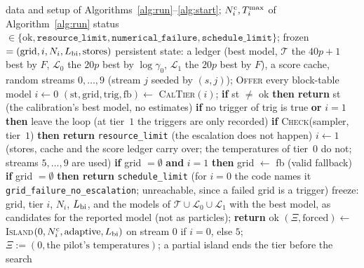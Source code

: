 \begin{algorithm}
\caption{Stage~4: calibration (adaptive tempering): pilot, grid, rebuilds, tier rule, fallback, freeze.}\label{alg:cal}
{\scriptsize
\begin{algorithmic}[1]
\Require data and setup of Algorithms~\ref{alg:run}--\ref{alg:start}; $N^{\mathrm c}_i,T^{\max}_i$ of Algorithm~\ref{alg:run}
\Ensure status $\in\{\text{ok},\texttt{resource\_limit},\texttt{numerical\_failure},\texttt{schedule\_limit}\}$; frozen $=(\text{grid},i,N_i,L_{\mathrm{bi}},\text{stores})$
\State persistent state: a ledger (best model, $\mathcal T$ the $40p+1$ best by $F$, $\mathcal L_0$ the $20p$ best by $\log\gamma_0$, $\mathcal L_1$ the $20p$ best by $F$), a score cache, random streams $0,\dots,9$ (stream $j$ seeded by $(s,j)$); \textsc{Offer} every block-table model %
\State $i\gets0$ %
\State $(\text{st},\text{grid},\text{trig},\text{fb})\gets$ \textsc{CalTier}$(i)$; \textbf{if} st $\ne$ ok \textbf{then return} st (the calibration's best model, no estimates) %
\State \textbf{if} no trigger of trig is true \textbf{or} $i=1$ \textbf{then} leave the loop (at tier~$1$ the triggers are only recorded) %
\State \textbf{if} \textsc{Check}(sampler, tier~$1$) \textbf{then return} \texttt{resource\_limit} (the escalation does not happen) %
\State $i\gets1$ (stores, cache and the score ledger carry over; the temperatures of tier~$0$ do not; streams $5,\dots,9$ are used) %
\EndWhile
\State \textbf{if} grid $=\emptyset$ \textbf{and} $i=1$ \textbf{then} grid $\gets$ fb (valid fallback) %
\State \textbf{if} grid $=\emptyset$ \textbf{then return} \texttt{schedule\_limit} (for $i=0$ the code names it \texttt{grid\_failure\_no\_escalation}; unreachable, since a failed grid is a trigger) %
\State freeze: grid, tier $i$, $N_i$, $L_{\mathrm{bi}}$, and the models of $\mathcal T\cup\mathcal L_0\cup\mathcal L_1$ with the best model, as candidates for the reported model (not as particles); \textbf{return} ok %
\EndProcedure
{}
\State $(\Xi,\text{forced})\gets$ \textsc{Island}$(0,N^{\mathrm c}_i,\text{adaptive},L_{\mathrm{bi}})$ on stream $0$ if $i=0$, else $5$; $\Xi:=(0,\text{the pilot's temperatures})$; a partial island ends the tier before the search %

\end{algorithmic}}
\end{algorithm}
